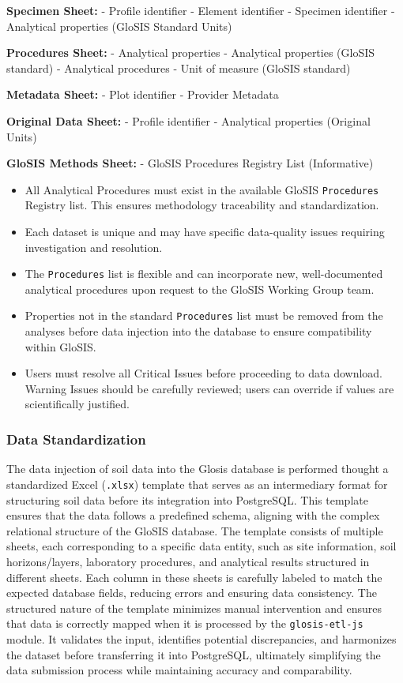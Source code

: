 \documentclass[
  10pt,
  b5paper,
  oneside]{book}
\begin{document}
\textbf{Specimen Sheet:} - Profile identifier - Element identifier - Specimen identifier - Analytical properties (GloSIS Standard Units)

\textbf{Procedures Sheet:} - Analytical properties - Analytical properties (GloSIS standard) - Analytical procedures - Unit of measure (GloSIS standard)

\textbf{Metadata Sheet:} - Plot identifier - Provider Metadata

\textbf{Original Data Sheet:} - Profile identifier - Analytical properties (Original Units)

\textbf{GloSIS Methods Sheet:} - GloSIS Procedures Registry List (Informative)

\begin{itemize}
\item
  All Analytical Procedures must exist in the available GloSIS \texttt{Procedures} Registry list. This ensures methodology traceability and standardization.
\item
  Each dataset is unique and may have specific data-quality issues requiring investigation and resolution.
\item
  The \texttt{Procedures} list is flexible and can incorporate new, well-documented analytical procedures upon request to the GloSIS Working Group team.
\item
  Properties not in the standard \texttt{Procedures} list must be removed from the analyses before data injection into the database to ensure compatibility within GloSIS.
\item
  Users must resolve all Critical Issues before proceeding to data download. Warning Issues should be carefully reviewed; users can override if values are scientifically justified.
\end{itemize}

\subsubsection{Data Standardization}\label{data-standardization}

The data injection of soil data into the Glosis database is performed thought a standardized Excel (\texttt{.xlsx}) template that serves as an intermediary format for structuring soil data before its integration into PostgreSQL. This template ensures that the data follows a predefined schema, aligning with the complex relational structure of the GloSIS database. The template consists of multiple sheets, each corresponding to a specific data entity, such as site information, soil horizons/layers, laboratory procedures, and analytical results structured in different sheets. Each column in these sheets is carefully labeled to match the expected database fields, reducing errors and ensuring data consistency. The structured nature of the template minimizes manual intervention and ensures that data is correctly mapped when it is processed by the \texttt{glosis-etl-js} module. It validates the input, identifies potential discrepancies, and harmonizes the dataset before transferring it into PostgreSQL, ultimately simplifying the data submission process while maintaining accuracy and comparability.
\end{document}
